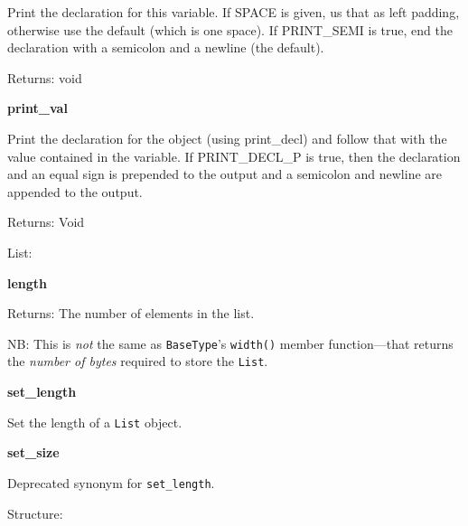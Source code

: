 \begin{description}

Print the declaration for this variable. If SPACE is given, us that as left
padding, otherwise use the default (which is one space). If PRINT\_SEMI is
true, end the declaration with a semicolon and a newline (the default).

Returns: void

\item {\bf print\_val}


Print the declaration for the object (using print\_decl) and follow that with
the value contained in the variable. If PRINT\_DECL\_P is true, then the
declaration and an equal sign is prepended to the output and a semicolon and
newline are appended to the output.

Returns: Void

\end{description}

List:

\begin{description}

\item {\bf length}


Returns: The number of elements in the list.

NB: This is {\em not\/} the same as {\tt BaseType}'s {\tt width()} member
function---that returns the {\em number of bytes\/} required to store the
{\tt List}.

\item {\bf set\_length}    

Set the length of a {\tt List} object.

\item {\bf set\_size}    

Deprecated synonym for {\tt set\_length}.

\end{description}

{\Tt Structure}:

